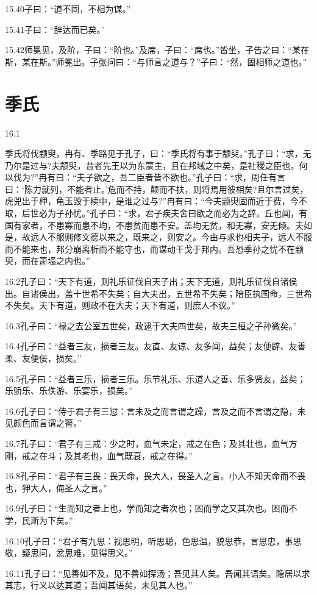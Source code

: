 \documentclass[a4paper,12pt,UTF8,twoside]{ctexbook}
\begin{document}
15.40子曰：“道不同，不相为谋。”

15.41子曰：“辞达而已矣。”

15.42师冕见，及阶，子曰：“阶也。”及席，子曰：“席也。”皆坐，子告之曰：“某在斯，某在斯。”师冕出。子张问曰：“与师言之道与？”子曰：“然，固相师之道也。”

\chapter{季氏}
16.1

季氏将伐颛臾，冉有、季路见于孔子，曰：“季氏将有事于颛臾。”孔子曰：“求，无乃尔是过与?夫颛臾，昔者先王以为东蒙主，且在邦域之中矣，是社稷之臣也。何以伐为?”冉有曰：“夫子欲之，吾二臣者皆不欲也。”孔子曰：“求，周任有言曰：‘陈力就列，不能者止。’危而不持，颠而不扶，则将焉用彼相矣?且尔言过矣，虎兕出于柙，龟玉毁于椟中，是谁之过与?”冉有曰：“今夫颛臾固而近于费，今不取，后世必为子孙忧。”孔子曰：“求，君子疾夫舍曰欲之而必为之辞。丘也闻，有国有家者，不患寡而患不均，不患贫而患不安。盖均无贫，和无寡，安无倾。夫如是，故远人不服则修文德以来之，既来之，则安之。今由与求也相夫子，远人不服而不能来也，邦分崩离析而不能守也，而谋动干戈于邦内。吾恐季孙之忧不在颛臾，而在萧墙之内也。”

16.2孔子曰：“天下有道，则礼乐征伐自天子出；天下无道，则礼乐征伐自诸侯出。自诸侯出，盖十世希不失矣；自大夫出，五世希不失矣；陪臣执国命，三世希不失矣。天下有道，则政不在大夫；天下有道，则庶人不议。”

16.3孔子曰：“禄之去公室五世矣，政逮于大夫四世矣，故夫三桓之子孙微矣。”

16.4孔子曰：“益者三友，损者三友。友直、友谅、友多闻，益矣；友便辟、友善柔、友便佞，损矣。”

16.5孔子曰：“益者三乐，损者三乐。乐节礼乐、乐道人之善、乐多贤友，益矣；乐骄乐、乐佚游、乐宴乐，损矣。”

16.6孔子曰：“侍于君子有三愆：言未及之而言谓之躁，言及之而不言谓之隐，未见颜色而言谓之瞽。”

16.7孔子曰：“君子有三戒：少之时，血气未定，戒之在色；及其壮也，血气方刚，戒之在斗；及其老也，血气既衰，戒之在得。”

16.8孔子曰：“君子有三畏：畏天命，畏大人，畏圣人之言。小人不知天命而不畏也，狎大人，侮圣人之言。”

16.9孔子曰：“生而知之者上也，学而知之者次也；困而学之又其次也。困而不学，民斯为下矣。”

16.10孔子曰：“君子有九思：视思明，听思聪，色思温，貌思恭，言思忠，事思敬，疑思问，忿思难，见得思义。”

16.11孔子曰：“见善如不及，见不善如探汤；吾见其人矣。吾闻其语矣。隐居以求其志，行义以达其道；吾闻其语矣，未见其人也。”
\end{document}
